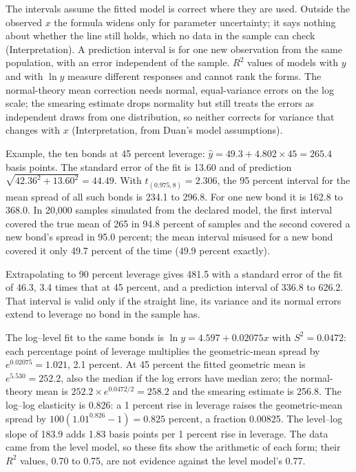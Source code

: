 \begin{qfmethod}
 The intervals assume the fitted model is correct where they are used. Outside the observed $x$ the formula widens only for parameter uncertainty; it says nothing about whether the line still holds, which no data in the sample can check (Interpretation). A prediction interval is for one new observation from the same population, with an error independent of the sample. $R^2$ values of models with $y$ and with $\ln y$ measure different responses and cannot rank the forms. The normal-theory mean correction needs normal, equal-variance errors on the log scale; the smearing estimate drops normality but still treats the errors as independent draws from one distribution, so neither corrects for variance that changes with $x$ (Interpretation, from Duan's model assumptions).

 Example, the ten bonds at 45 percent leverage: $\hat y=49.3+4.802\times45=265.4$ basis points. The standard error of the fit is 13.60 and of prediction $\sqrt{42.36^2+13.60^2}=44.49$. With $t_{(0.975,8)}=2.306$, the 95 percent interval for the mean spread of all such bonds is 234.1 to 296.8. For one new bond it is 162.8 to 368.0. In 20{,}000 samples simulated from the declared model, the first interval covered the true mean of 265 in 94.8 percent of samples and the second covered a new bond's spread in 95.0 percent; the mean interval misused for a new bond covered it only 49.7 percent of the time (49.9 percent exactly).

Extrapolating to 90 percent leverage gives 481.5 with a standard error of the fit of 46.3, 3.4 times that at 45 percent, and a prediction interval of 336.8 to 626.2. That interval is valid only if the straight line, its variance and its normal errors extend to leverage no bond in the sample has.

The log--level fit to the same bonds is $\ln y=4.597+0.02075x$ with $S^2=0.0472$: each percentage point of leverage multiplies the geometric-mean spread by $e^{0.02075}=1.021$, 2.1 percent. At 45 percent the fitted geometric mean is $e^{5.530}=252.2$, also the median if the log errors have median zero; the normal-theory mean is $252.2\times e^{0.0472/2}=258.2$ and the smearing estimate is 256.8. The log--log elasticity is 0.826: a 1 percent rise in leverage raises the geometric-mean spread by $100(1.01^{0.826}-1)=0.825$ percent, a fraction 0.00825. The level--log slope of 183.9 adds 1.83 basis points per 1 percent rise in leverage. The data came from the level model, so these fits show the arithmetic of each form; their $R^2$ values, 0.70 to 0.75, are not evidence against the level model's 0.77.


\end{qfmethod}
